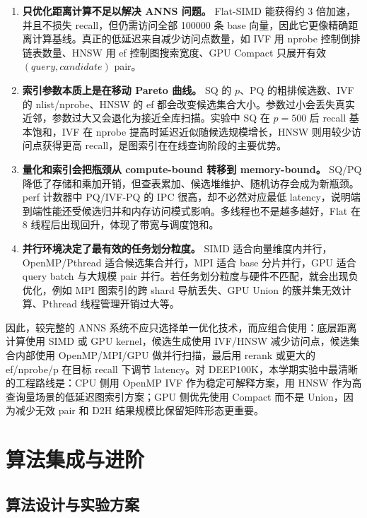 \documentclass[a4paper]{article}
\begin{document}
\begin{enumerate}
  \item \textbf{只优化距离计算不足以解决 ANNS 问题。} Flat-SIMD 能获得约 3 倍加速，并且不损失 recall，但仍需访问全部 100000 条 base 向量，因此它更像精确距离计算基线。真正的低延迟来自减少访问点数量，如 IVF 用 nprobe 控制倒排链表数量、HNSW 用 ef 控制图搜索宽度、GPU Compact 只展开有效 $(query,candidate)$ pair。
  \item \textbf{索引参数本质上是在移动 Pareto 曲线。} SQ 的 $p$、PQ 的粗排候选数、IVF 的 nlist/nprobe、HNSW 的 ef 都会改变候选集合大小。参数过小会丢失真实近邻，参数过大又会退化为接近全库扫描。实验中 SQ 在 $p=500$ 后 recall 基本饱和，IVF 在 nprobe 提高时延迟近似随候选规模增长，HNSW 则用较少访问点获得更高 recall，是图索引在在线查询阶段的主要优势。
  \item \textbf{量化和索引会把瓶颈从 compute-bound 转移到 memory-bound。} SQ/PQ 降低了存储和乘加开销，但查表累加、候选堆维护、随机访存会成为新瓶颈。perf 计数器中 PQ/IVF-PQ 的 IPC 很高，却不必然对应最低 latency，说明端到端性能还受候选归并和内存访问模式影响。多线程也不是越多越好，Flat 在 8 线程后出现回升，体现了带宽与调度饱和。
  \item \textbf{并行环境决定了最有效的任务划分粒度。} SIMD 适合向量维度内并行，OpenMP/Pthread 适合候选集合并行，MPI 适合 base 分片并行，GPU 适合 query batch 与大规模 pair 并行。若任务划分粒度与硬件不匹配，就会出现负优化，例如 MPI 图索引的跨 shard 导航丢失、GPU Union 的簇并集无效计算、Pthread 线程管理开销过大等。
\end{enumerate}

因此，较完整的 ANNS 系统不应只选择单一优化技术，而应组合使用：底层距离计算使用 SIMD 或 GPU kernel，候选生成使用 IVF/HNSW 减少访问点，候选集合内部使用 OpenMP/MPI/GPU 做并行扫描，最后用 rerank 或更大的 ef/nprobe/p 在目标 recall 下调节 latency。对 DEEP100K，本学期实验中最清晰的工程路线是：CPU 侧用 OpenMP IVF 作为稳定可解释方案，用 HNSW 作为高查询量场景的低延迟图索引方案；GPU 侧优先使用 Compact 而不是 Union，因为减少无效 pair 和 D2H 结果规模比保留矩阵形态更重要。

\section{算法集成与进阶}

\subsection{算法设计与实验方案}
\end{document}
